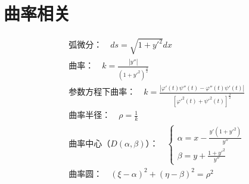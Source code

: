 \documentclass{article}
\begin{document}
\section{曲率相关}
\[
\begin{aligned}
&\text{弧微分：} \quad ds = \sqrt{1+y'^2}dx \\
&\text{曲率：} \quad k = \frac{|y''|}{(1+y'^2)^{\frac{3}{2}}} \\
&\text{参数方程下曲率：} \quad k = \frac{|\varphi'(t)\psi''(t) - \varphi''(t)\psi'(t)|}{[\varphi'^2(t) + \psi'^2(t)]^{\frac{3}{2}}} \\
&\text{曲率半径：} \quad \rho = \frac{1}{k} \\
&\text{曲率中心（} D(\alpha, \beta) \text{）：} \quad \begin{cases} \alpha = x - \frac{y'(1+y'^2)}{y''} \\ \beta = y + \frac{1+y'^2}{y''} \end{cases} \\
&\text{曲率圆：} \quad (\xi - \alpha)^2 + (\eta - \beta)^2 = \rho^2
\end{aligned}
\]
\end{document}
